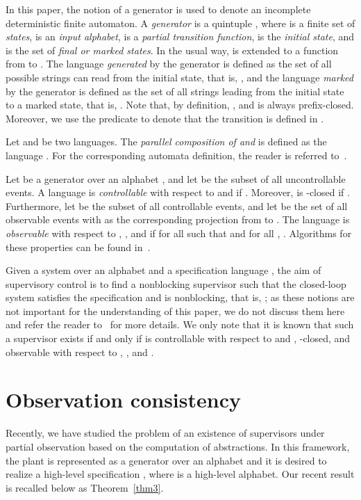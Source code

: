 \documentclass[preprint,1p,times]{elsarticle}
\begin{document}
  In this paper, the notion of a generator is used to denote an incomplete deterministic finite automaton. A {\em generator\/}  is a quintuple , where  is a finite set of {\em states},  is an {\em input alphabet},  is a {\em partial transition function},  is the {\em initial state}, and  is the set of {\em final or marked states}. In the usual way,  is extended to a function from  to . The language {\em generated\/} by the generator  is defined as the set of all possible strings  can read from the initial state, that is, , and the language {\em marked\/} by the generator  is defined as the set of all strings leading  from the initial state to a marked state, that is, . Note that, by definition, , and  is always prefix-closed. Moreover, we use the predicate  to denote that the transition  is defined in . 

	Let  and  be two languages. The {\em parallel composition of  and \/} is defined as the language . For the corresponding automata definition, the reader is referred to~\cite{CL08}. 

  Let  be a generator over an alphabet , and let  be the subset of all uncontrollable events. A language  is {\em controllable} with respect to  and  if . Moreover,  is -closed if . Furthermore, let  be the subset of all controllable events, and let  be the set of all observable events with  as the corresponding projection from  to . The language  is {\em observable\/} with respect to , , and  if for all  such that  and for all , . Algorithms for these properties can be found in~\cite{CL08}.

  Given a system  over an alphabet  and a specification language , the aim of supervisory control is to find a nonblocking supervisor  such that the closed-loop system  satisfies the specification and is nonblocking, that is, ; as these notions are not important for the understanding of this paper, we do not discuss them here and refer the reader to~\cite{CL08,Won04} for more details. We only note that it is known that such a supervisor exists if and only if  is controllable with respect to  and , -closed, and observable with respect to , , and . 


\section{Observation consistency}
  Recently, we have studied the problem of an existence of supervisors under partial observation based on the computation of abstractions. In this framework, the plant is represented as a generator  over an alphabet  and it is desired to realize a high-level specification , where  is a high-level alphabet. Our recent result is recalled below as Theorem~\ref{thm3}. 
  
\end{document}
